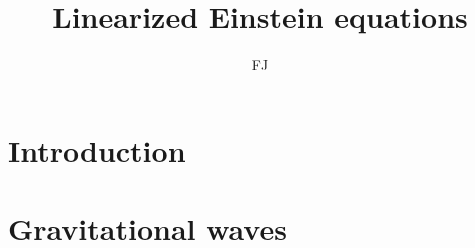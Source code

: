 \documentclass[12pt, a4paper]{article} %
\title{Linearized Einstein equations} %
\author{FJ} %
\date{}
\begin{document}

\maketitle %

\section{Introduction}


\section{Gravitational waves}


\end{document}
